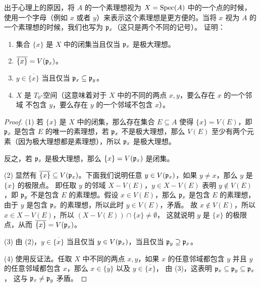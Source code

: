 \begin{problem}
  出于心理上的原因，将 $A$ 的一个素理想视为 $X=\operatorname{Spec}(A)$ 中的一个点的时候，
  使用一个字母（例如 $x$ 或者 $y$）来表示这个素理想是更方便的。当将 $x$
  视为 $A$ 的一个素理想的时候，我们也写为 $\mathfrak{p}_x$（这只是两个不同的记号）。
  证明：
  \begin{enumerate}
    \item 集合 $\{x\}$ 是 $X$ 中的闭集当且仅当 $\mathfrak{p}_x$ 是极大理想。
    \item $\overline{\{x\}}=V(\mathfrak{p}_x)$。
    \item $y\in\overline{\{x\}}$ 当且仅当 $\mathfrak{p}_x\subseteq\mathfrak{p}_y$。
    \item $X$ 是 $T_0$-空间（这意味着对于 $X$ 中的不同的两点 $x,y$，要么存在 $x$ 的一个邻域
    不包含 $y$，要么存在 $y$ 的一个邻域不包含 $x$）。
  \end{enumerate}
\end{problem}
\begin{proof}
  (1) 若 $\{x\}$ 是 $X$ 中的闭集，那么存在集合 $E\subseteq A$ 使得 $\{x\}=V(E)$，即
  $\mathfrak{p}_x$ 是包含 $E$ 的唯一的素理想，若 $\mathfrak{p}_x$ 不是极大理想，那么 $V(E)$
  至少有两个元素（因为极大理想都是素理想），所以 $\mathfrak{p}_x$ 是极大理想。

  反之，若 $\mathfrak{p}_x$ 是极大理想，那么 $\{x\}=V(\mathfrak{p}_x)$ 是闭集。

  (2) 显然有 $\overline{\{x\}}\subseteq V(\mathfrak{p}_x)$。下面我们说明任意
  $y\in V(\mathfrak{p}_x)$，如果 $y\neq x$，那么 $y$ 是 $\{x\}$ 的极限点。
  即任取 $y$ 的邻域 $X-V(E)$，$y\in X-V(E)$ 表明 $y\notin V(E)$，即 $\mathfrak{p}_y$
  不是包含 $E$ 的素理想。假设 $x\in V(E)$，那么 $\mathfrak{p}_x$ 是包含 $E$
  的素理想，由于 $y$ 是包含 $\mathfrak{p}_x$ 的素理想，所以此时 $y\in V(E)$，矛盾。
  故 $x\notin V(E)$，所以 $x\in X-V(E)$，所以 $(X-V(E))\cap\{x\}\neq\emptyset$，
  这就说明 $y$ 是 $\{x\}$ 的极限点，从而 $\overline{\{x\}}=V(\mathfrak{p}_x)$。

  (3) 由 (2)，$y\in\overline{\{x\}}$ 当且仅当 $y\in V(\mathfrak{p}_x)$，当且仅当 
  $\mathfrak{p}_y\supseteq \mathfrak{p}_x$。
  
  (4) 使用反证法。任取 $X$ 中不同的两点 $x,y$，如果 $x$ 的任意邻域都包含 $y$ 并且
  $y$ 的任意邻域都包含 $x$，那么 $x\in\overline{\{y\}}$ 以及 $y\in\overline{\{x\}}$，
  由 (3)，这表明 $\mathfrak{p}_x\subseteq\mathfrak{p}_y\subseteq\mathfrak{p}_x$，
  这与 $\mathfrak{p}_x\neq\mathfrak{p}_y$ 矛盾。
\end{proof}

